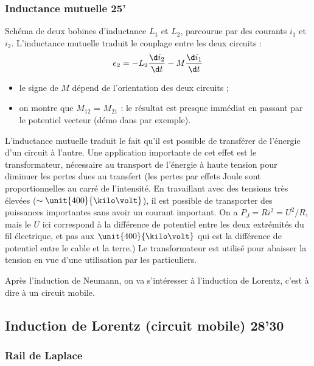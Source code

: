 \subsubsection{Inductance mutuelle 25'}

Schéma de deux bobines d'inductance $L_1$ et $L_2$, parcourue par des courants $i_1$ et $i_2$.
L'inductance mutuelle traduit le couplage entre les deux circuits :
\begin{equation}
e_2 = -L_2\frac{\d i_2}{\d t} - M\frac{\d i_1}{\d t}
\end{equation}

\begin{remarque}
\begin{itemize}
\item le signe de $M$ dépend de l'orientation des deux circuits ;
\item on montre que $M_{12}$ = $M_{21}$ : le résultat est presque immédiat en passant par le potentiel vecteur (démo dans \cite{Perez2009} par exemple).
\end{itemize}
\end{remarque}

L'inductance mutuelle traduit le fait qu'il est possible de transférer de l'énergie d'un circuit à l'autre.
Une application importante de cet effet est le transformateur, nécessaire au transport de l'énergie à haute tension pour diminuer les pertes dues au transfert (les pertes par effets Joule sont proportionnelles au carré de l'intensité.
En travaillant avec des tensions très élevées ($\sim \unit{400}{\kilo\volt}$), il est possible de transporter des puissances importantes sans avoir un courant important.
On a $P_J = Ri^2 = U^2/R$, mais le $U$ ici correspond à la différence de potentiel entre les deux extrémités du fil électrique, et pas aux $\unit{400}{\kilo\volt}$ qui est la différence de potentiel entre le cable et la terre.)
Le transformateur est utilisé pour abaisser la tension en vue d'une utilisation par les particuliers.

\begin{transition}
Après l'induction de Neumann, on va s'intéresser à l'induction de Lorentz, c'est à dire à un circuit mobile.
\end{transition}

\subsection{Induction de Lorentz (circuit mobile) 28'30}

\subsubsection{Rail de Laplace}

